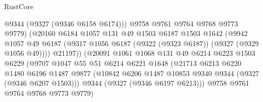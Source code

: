 \begin{lexlean}{RustCore}
\begin{coremodule}
                                  @9344
                                  (@9327 (@9346 @6158 @6174)))
                                @9758
                                @9761
                                @9764
                                @9768
                                @9773
                                @9779)
                              (@20160
                                @6184
                                @1057
                                @131
                                @49
                                @1503
                                @6187
                                @1503
                                @1642
                                (@9942
                                  @1057
                                  @49
                                  @6187
                                  (@9317
                                    @1056
                                    @6187
                                    (@9322 (@9323 @6187))
                                    (@9327 (@9329 @1056 @49))))
                                @21197))
                            (@20091
                              @1061
                              @1068
                              @131
                              @49
                              @6214
                              @6223
                              @1503
                              @6229
                              (@9707
                                @1047
                                @55
                                @51
                                @6214
                                @6221
                                @1648
                                (@21713
                                  @6213
                                  @6220
                                  @1480
                                  @6196
                                  @1487
                                  @9877
                                  (@10842
                                    @6206
                                    @1487
                                    @10853
                                    @9340
                                    @9344
                                    (@9327 (@9346 @6207 @1503)))
                                  @9344
                                  (@9327 (@9346 @6197 @6213)))
                                @9758
                                @9761
                                @9764
                                @9768
                                @9773
                                @9779)

\end{coremodule}
\end{lexlean}
